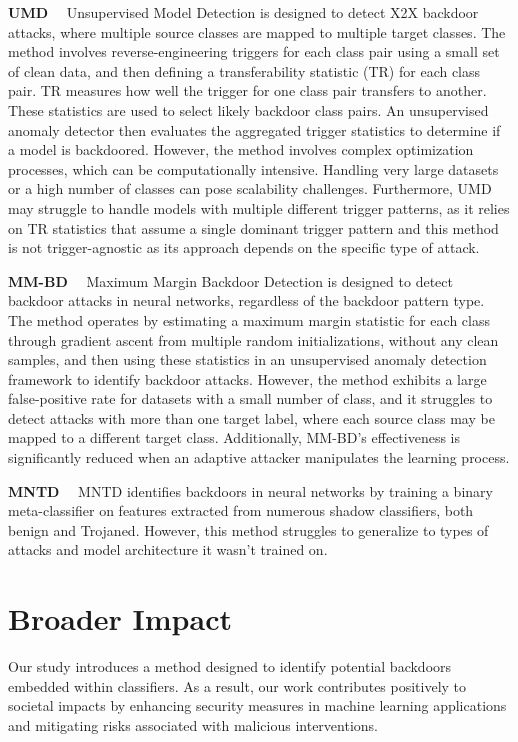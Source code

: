 \textbf{UMD} \ \
Unsupervised Model Detection \cite{umd} is designed to detect X2X backdoor attacks, where multiple source classes are mapped to multiple target classes. The method involves reverse-engineering triggers for each class pair using a small set of clean data, and then defining a transferability statistic (TR) for each class pair. TR measures how well the trigger for one class pair transfers to another. These statistics are used to select likely backdoor class pairs. An unsupervised anomaly detector then evaluates the aggregated trigger statistics to determine if a model is backdoored. However, the method involves complex optimization processes, which can be computationally intensive. Handling very large datasets or a high number of classes can pose scalability challenges. Furthermore, UMD may struggle to handle models with multiple different trigger patterns, as it relies on TR statistics that assume a single dominant trigger pattern and this method is not trigger-agnostic as its approach depends on the specific type of attack.

\textbf{MM-BD} \ \
Maximum Margin Backdoor Detection \cite{MMBD} is designed to detect backdoor attacks in neural networks, regardless of the backdoor pattern type. The method operates by estimating a maximum margin statistic for each class through gradient ascent from multiple random initializations, without any clean samples, and then using these statistics in an unsupervised anomaly detection framework to identify backdoor attacks. However, the method exhibits a large false-positive rate for datasets with a small number of class, and it struggles to detect attacks with more than one target label, where each source class may be mapped to a different target class. Additionally,  MM-BD's effectiveness is significantly reduced when an adaptive attacker manipulates the learning process.


\textbf{MNTD} \ \
MNTD \cite{MNTD} identifies backdoors in neural networks by training a binary meta-classifier on features extracted from numerous shadow classifiers, both benign and Trojaned. However, this method struggles to generalize to types of attacks and model architecture it wasn't trained on. 



\section{Broader Impact}
\label{impact}
Our study introduces a method designed to identify potential backdoors embedded within classifiers. As a result, our work contributes positively to societal impacts by enhancing security measures in machine learning applications and mitigating risks associated with malicious interventions.



